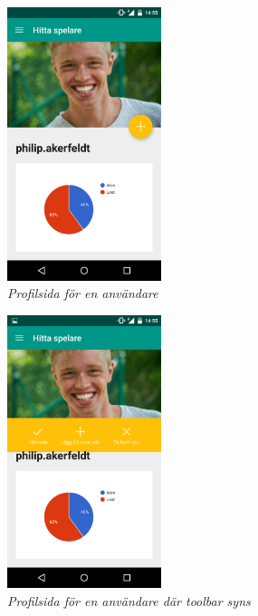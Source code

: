 \documentclass[a4paper, 11pt]{article}
\begin{document}
\begin{enumerate}
\begin{figure}[H]
	\begin{center}
	\includegraphics[width=0.4\textwidth]{app_profile_fab} 
	\end{center}
	\caption{\textit{Profilsida för en användare}}
\end{figure}

\begin{figure}[H]
	\begin{center}
	\includegraphics[width=0.4\textwidth]{app_profile_toolbar} 
	\end{center}
	\caption{\textit{Profilsida för en användare där toolbar syns}}
\end{figure}

\end{enumerate} 
\end{document}
